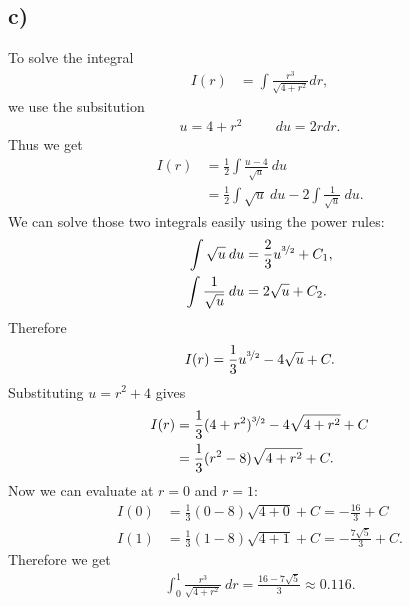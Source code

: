 \documentclass{article}
\begin{document}
\subsection*{c)}
To solve the integral
\begin{align*}
  I(r) & = \int \frac{r^3}{\sqrt{4+r^2}}dr,
\end{align*}
we use the subsitution
\begin{align*}
  u = 4+r^2 \hspace{1cm}  du = 2rdr.
\end{align*}
Thus we get
\begin{align*}
  I(r) & = \frac{1}{2}\int \frac{u-4}{\sqrt{u}}\:du                    \\
       & =\frac{1}{2}\int\sqrt{u}\:du - 2 \int \frac{1}{\sqrt{u}}\:du.
\end{align*}
We can solve those two integrals easily using the power rules:
\begin{align*}
  \int \sqrt{u}\:du           & =\frac{2}{3}u^{\nicefrac{3}{2}}+C_1, \\
  \int \frac{1}{\sqrt{u}}\:du & =2\sqrt{u}+C_2.
\end{align*}
Therefore
\begin{align*}
  I(r) = \frac{1}{3}u^{\nicefrac{3}{2}}-4\sqrt{u}+C.
\end{align*}
Substituting $u=r^2+4$ gives
\begin{align*}
  I(r) & = \frac{1}{3}(4+r^2)^{\nicefrac{3}{2}}-4\sqrt{4+r^2} + C \\
       & = \frac{1}{3}(r^2-8)\sqrt{4+r^2}+C.
\end{align*}
Now we can evaluate at $r=0$ and $r=1$:
\begin{align*}
  I(0) & =\frac{1}{3}(0-8)\sqrt{4+0}+C=-\frac{16}{3}+C         \\
  I(1) & =\frac{1}{3}(1-8)\sqrt{4+1}+C=-\frac{7\sqrt{5}}{3}+C.
\end{align*}
Therefore we get
\begin{align*}
  \int_0^1\frac{r^3}{\sqrt{4+r^2}}\:dr = \frac{16-7\sqrt{5}}{3} \approx 0.116.
\end{align*}
\end{document}
